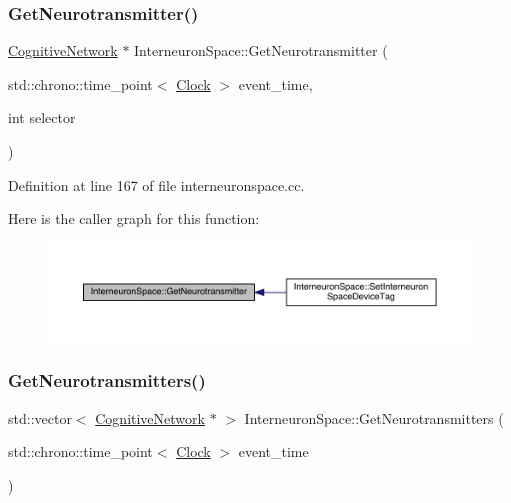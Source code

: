\subsubsection{\texorpdfstring{Get\+Neurotransmitter()}{GetNeurotransmitter()}}
{\footnotesize\ttfamily \hyperlink{class_cognitive_network}{Cognitive\+Network} $\ast$ Interneuron\+Space\+::\+Get\+Neurotransmitter (\begin{DoxyParamCaption}\item[{std\+::chrono\+::time\+\_\+point$<$ \hyperlink{universe_8h_a0ef8d951d1ca5ab3cfaf7ab4c7a6fd80}{Clock} $>$}]{event\+\_\+time,  }\item[{int}]{selector }\end{DoxyParamCaption})}



Definition at line 167 of file interneuronspace.\+cc.

Here is the caller graph for this function\+:\nopagebreak
\begin{figure}[H]
\begin{center}
\leavevmode
\includegraphics[width=350pt]{class_interneuron_space_a7a60c95c8706cbff3084e74b7b15d75c_icgraph}
\end{center}
\end{figure}
\mbox{\label{class_interneuron_space_aaae45b76a4c059aae1e27bde3901371c}} 
\subsubsection{\texorpdfstring{Get\+Neurotransmitters()}{GetNeurotransmitters()}}
{\footnotesize\ttfamily std\+::vector$<$ \hyperlink{class_cognitive_network}{Cognitive\+Network} $\ast$ $>$ Interneuron\+Space\+::\+Get\+Neurotransmitters (\begin{DoxyParamCaption}\item[{std\+::chrono\+::time\+\_\+point$<$ \hyperlink{universe_8h_a0ef8d951d1ca5ab3cfaf7ab4c7a6fd80}{Clock} $>$}]{event\+\_\+time }\end{DoxyParamCaption})}



